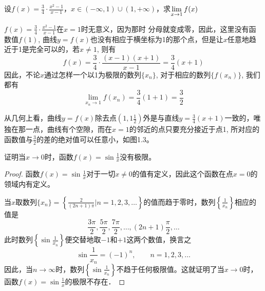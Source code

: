 \begin{example}
设$f(x)=\frac{3}{4}\cdot \frac{x^2-1}{x-1}$，$x\in(-\infty,1)\cup(1,+\infty)$，求$\displaystyle\lim_{x\to 1}f(x)$
\end{example}

\begin{solution}
    $f(x)=\frac{3}{4}\cdot \frac{x^2-1}{x-1}$在$x=1$时无意义，因为那时
    分母就变成零，因此，这里没有函数值$f(1)$, 曲线$y=f(x)$也没有相应于横坐标为1的那个点，但是让$x$任意地趋近于1是完全可以的，若$x\ne 1$, 则有
  \[  f (x) =\frac{3}{4}\cdot  \frac{(x-1)(x+1)}{x-1}=\frac{3}{4}(x+1)\]
  因此，不论$x$通过怎样一个以1为极限的数列$\{x_n\}$, 对于相应的数列$\{f(x_n)\}$, 我们都有
  \[\lim_{x_n\to 1} f (x_n) =\frac{3}{4} (1+1) =\frac{3}{2}\]

    从几何上看，曲线$y=f(x)$除去点$\left(1,1\frac{1}{2}\right)$外是与直线$y=\frac{3}{4}(x+1)$一致的，唯独在那一点，曲线有个空隙，而在$x=1$的邻近的点只要充分接近于点1, 所对应的函数值与$\frac{3}{2}$的差的绝对值可以任意小，如图1.3。
\end{solution}
    
\begin{figure}[htp]
    \centering
{}
    \caption{}
\end{figure}

\begin{example}
证明当$x\to 0$时，函数$f(x)=\sin\frac{1}{x}$没有极限。
\end{example}

\begin{proof}
函数$f(x)=\sin\frac{1}{x}$对于一切$x\ne 0$的值有定义，因此这个函数在点$x=0$的领域内有定义。

当$x$取数列$\{x_n\}=\left\{\frac{2}{(2n+1)\pi}\Big| n=1,2,3,\ldots\right\}$的值而趋于零时，数列$\left\{\frac{1}{x_n}\right\}$相应的值是
\[\frac{3\pi}{2},\frac{5\pi}{2},\frac{7\pi}{2},\ldots,(2n+1)\frac{\pi}{2},\ldots\]
此时数列$\left\{\sin\frac{1}{x_n}\right\}$便交替地取$-1$和$+1$这两个数值，换言之
\[\sin\frac{1}{x_n}=(-1)^n,\qquad n=1,2,3,\ldots\]
因此，当$n\to\infty$时，数列$\left\{\sin\frac{1}{x_n}\right\}$不趋于任何极限值。这就证明了当$x\to 0$时，函数$f(x)=\sin\frac{1}{x}$的极限不存在．
\end{proof}

